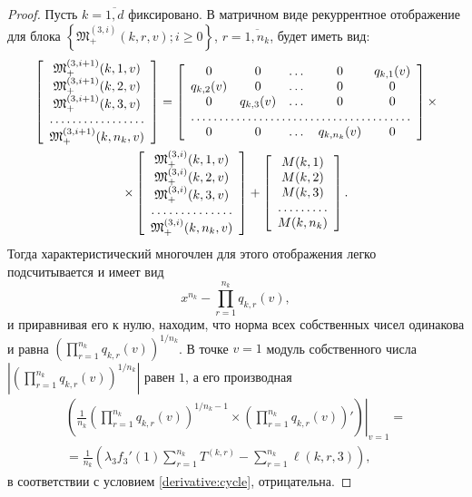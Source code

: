 \begin{proof}
Пусть $k =\overline{1, d}$ фиксировано. В матричном виде рекуррентное отображение для блока $\left\{\mathfrak{M}_+^{(3, i)}(k, r, v); i \geqslant 0\right\}$,  $r =\overline{1, n_k}$,  будет иметь вид:
\begin{multline*}
\left[ \begin{array}{c}
    \mathfrak{M}_+^{(3, i+1)}(k, 1, v) \\
    \mathfrak{M}_+^{(3, i+1)}(k, 2, v) \\
    \mathfrak{M}_+^{(3, i+1)}(k, 3, v) \\
    \hdotsfor{1} \\
    \mathfrak{M}_+^{(3, i+1)}(k, n_k, v)
\end{array}\right]
=
\left[ \begin{array}{c c c c c c}
    0       & 0  & \dots & 0 &   q_{k, 1}(v) \\
    q_{k, 2}(v)       & 0  & \dots & 0 & 0 \\
    0       & q_{k, 3}(v)  & \dots  &0  & 0 \\
    \hdotsfor{5} \\
    0       & 0  & \dots &  q_{k, n_k}(v) & 0 \\
\end{array}\right]
\times \\ \times
\left[ \begin{array}{c}
    \mathfrak{M}_+^{(3, i)}(k, 1, v) \\
    \mathfrak{M}_+^{(3, i)}(k, 2, v) \\
    \mathfrak{M}_+^{(3, i)}(k, 3, v) \\
    \hdotsfor{1} \\
    \mathfrak{M}_+^{(3, i)}(k, n_k, v)\\
\end{array}\right]
+
\left[ \begin{array}{c}
    M(k, 1) \\
    M(k, 2) \\
    M(k, 3) \\
    \hdotsfor{1} \\
    M(k, n_k) \\
\end{array}\right].
\end{multline*}
Тогда характеристический многочлен для этого отображения легко подсчитывается и имеет вид 
$$
x^{n_k} - \prod_{r=1}^{n_k}q_{k, r} (v), 
$$
и приравнивая его к нулю,  находим,  что норма всех собственных чисел одинакова и равна $\left(\prod_{r=1}^{n_k}q_{k, r} (v)\right)^{1/n_k}$. В точке $v=1$ модуль собственного числа $|\left(\prod_{r=1}^{n_k}q_{k, r} (v)\right)^{1/n_k}|$ равен $1$,  а его производная
\begin{multline*}
\left(\frac{1}{n_k} \left.\left(\prod_{r=1}^{n_k}q_{k, r} (v)\right)^{1/n_k - 1} \times \left(\prod_{r=1}^{n_k}q_{k, r}(v)\right) '  \right)\right|_{v=1}=\\
=\frac{1}{n_k} \left(\lambda_3 f_3'(1) \sum_{r=1}^{n_k} T^{(k, r)} -\sum_{r=1}^{n_k} \ell(k, r, 3)\right), 
\end{multline*}
в соответствии с условием \eqref{derivative:cycle},  отрицательна.


\end{proof}
